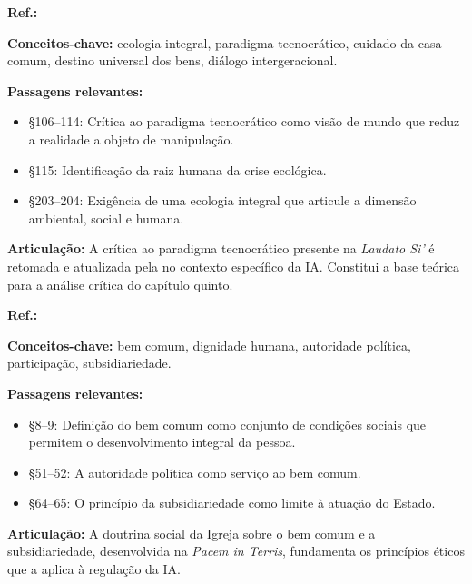 \begin{fichamento}
    \textbf{Ref.:} \cite{Francisco2015LS}
    
    \textbf{Conceitos-chave:} ecologia integral, paradigma tecnocrático, cuidado da casa comum, destino universal dos bens, diálogo intergeracional.
    
    \textbf{Passagens relevantes:}
    \begin{itemize}
        \item §106–114: Crítica ao paradigma tecnocrático como visão de mundo que reduz a realidade a objeto de manipulação.
        \item §115: Identificação da raiz humana da crise ecológica.
        \item §203–204: Exigência de uma ecologia integral que articule a dimensão ambiental, social e humana.
    \end{itemize}
    
    \textbf{Articulação:} A crítica ao paradigma tecnocrático presente na \textit{Laudato Si'} é retomada e atualizada pela \MH{} no contexto específico da IA. Constitui a base teórica para a análise crítica do capítulo quinto.
\end{fichamento}

\begin{fichamento}
    \textbf{Ref.:} \cite{JoaoXXIII1963PT}
    
    \textbf{Conceitos-chave:} bem comum, dignidade humana, autoridade política, participação, subsidiariedade.
    
    \textbf{Passagens relevantes:}
    \begin{itemize}
        \item §8–9: Definição do bem comum como conjunto de condições sociais que permitem o desenvolvimento integral da pessoa.
        \item §51–52: A autoridade política como serviço ao bem comum.
        \item §64–65: O princípio da subsidiariedade como limite à atuação do Estado.
    \end{itemize}
    
    \textbf{Articulação:} A doutrina social da Igreja sobre o bem comum e a subsidiariedade, desenvolvida na \textit{Pacem in Terris}, fundamenta os princípios éticos que a \MH{} aplica à regulação da IA.
\end{fichamento}

